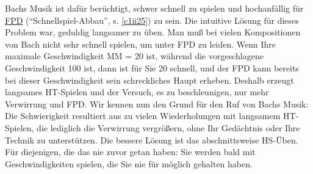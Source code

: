 Bachs Musik ist dafür berüchtigt, schwer schnell zu spielen und hochanfällig für \hyperref[fpd]{FPD} (\enquote{Schnellspiel-Abbau}, s. \autoref{c1ii25}) zu sein.
Die intuitive Lösung für dieses Problem war, geduldig langsamer zu üben.
Man muß bei vielen Kompositionen von Bach nicht sehr schnell spielen, um unter FPD zu leiden.
Wenn Ihre maximale Geschwindigkeit MM = 20 ist, während die vorgeschlagene Geschwindigkeit 100 ist, dann ist für Sie 20 schnell, und der FPD kann  bereits bei dieser Geschwindigkeit sein schreckliches Haupt erheben.
Deshalb erzeugt langsames HT-Spielen und der Versuch, es zu beschleunigen, nur mehr Verwirrung und FPD.
Wir kennen nun den Grund für den Ruf von Bachs Musik: Die Schwierigkeit resultiert aus zu vielen Wiederholungen mit langsamem HT-Spielen, die lediglich die Verwirrung vergrößern, ohne Ihr Gedächtnis oder Ihre Technik zu unterstützen.
Die bessere Lösung ist das abschnittsweise HS-Üben.
Für diejenigen, die das nie zuvor getan haben: Sie werden bald mit Geschwindigkeiten spielen, die Sie nie für möglich gehalten haben.


\label{ruhig}

